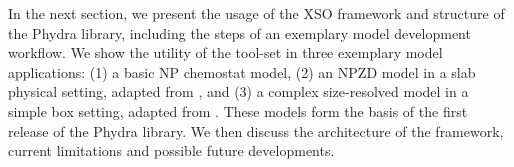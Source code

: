 \documentclass[journal abbreviation, manuscript]{copernicus}
\begin{document}
In the next section, we present the usage of the XSO framework and structure of the Phydra library, including the steps of an exemplary model development workflow. We show the utility of the tool-set in three exemplary model applications: (1) a basic NP chemostat model, (2) an NPZD model in a slab physical setting, adapted from \citet{Anderson2015c}, and (3) a complex size-resolved model in a simple box setting, adapted from \citet{Banas2011b}. These models form the basis of the first release of the Phydra library. We then discuss the architecture of the framework, current limitations and possible future developments.

\end{document}
